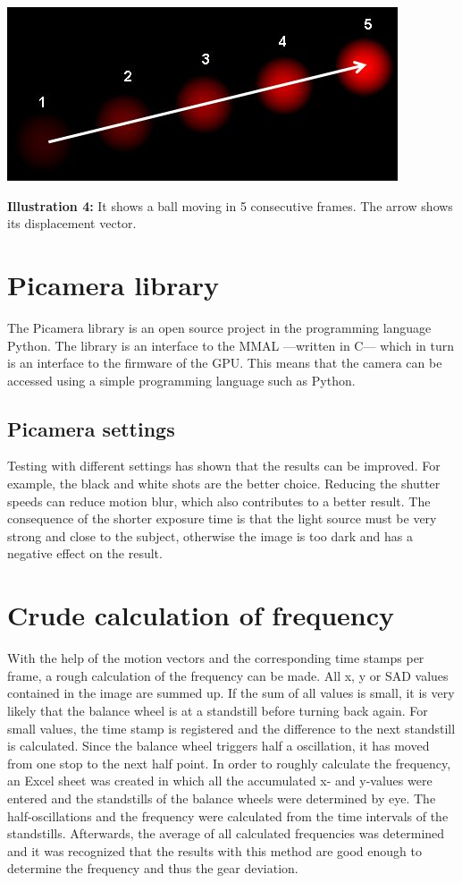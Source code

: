 \documentclass[12pt, a4paper]{report}
\begin{document}
\noindent
\begin{center}
\includegraphics[scale=0.3]{Images/optical_flow_basic1.jpg}

{\bf Illustration 4:}  It shows a ball moving in 5 consecutive frames. The arrow shows its displacement vector.
\end{center}

\newpage

\section{Picamera library}
The Picamera library is an open source project in the programming language Python. The library is an interface to the MMAL ---written in C--- which in turn is an interface to the firmware of the GPU.
This means that the camera can be accessed using a simple programming language such as Python.

\subsection {Picamera settings}
Testing with different settings has shown that the results can be improved. For example, the black and white shots are the better choice. Reducing the shutter speeds can reduce motion blur, which also contributes to a better result.
The consequence of the shorter exposure time is that the light source must be very strong and close to the subject, otherwise the image is too dark and has a negative effect on the result.

\section{Crude calculation of frequency}
With the help of the motion vectors and the corresponding time stamps per frame, a rough calculation of the frequency can be made. All x, y or SAD values contained in the image are summed up. If the sum of all values is small, it is very likely that the balance wheel is at a standstill before turning back again. For small values, the time stamp is registered and the difference to the next standstill is calculated. Since the balance wheel triggers half a oscillation, it has moved from one stop to the next half point. 
In order to roughly calculate the frequency, an Excel sheet was created in which all the accumulated x- and y-values were entered and the standstills of the balance wheels were determined by eye. The half-oscillations and the frequency were calculated from the time intervals of the standstills. Afterwards, the average of all calculated frequencies was determined and it was recognized that the results with this method are good enough to determine the frequency and thus the gear deviation. 
\end{document}
